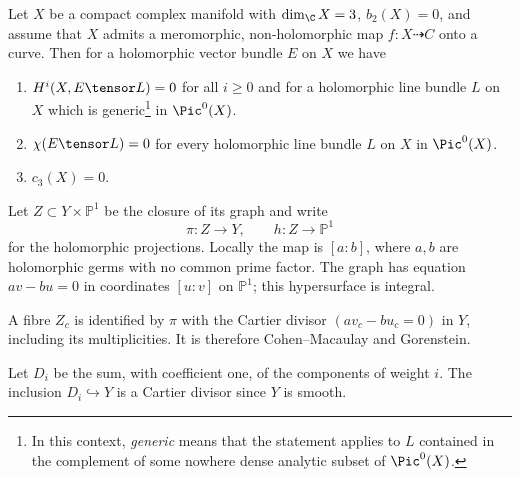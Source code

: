 
\begin{theorem}\label{theorem main2 new}
Let $X$ be a compact complex manifold with $\dim_\C X=3$, $b_2(X)=0$, and assume that $X$ admits a meromorphic, non-holomorphic map  $f\colon X\dashrightarrow C$  onto a curve. Then for a holomorphic vector bundle $E$ on $X$ we have
\begin{enumerate}
	\item $H^i(X,E\tensor L) = 0$ for all $i \geq 0$ and for a holomorphic line bundle $L$ on $X$ which is generic\footnote{In this context, \emph{generic} means that the statement applies to $L$ contained in the complement of some nowhere dense analytic subset of $\Pic^0(X)$.}   in $\Pic^0(X)$.
	\item $\chi(E\tensor L) = 0$ for every holomorphic line bundle $L$ on $X$ in $\Pic^0(X)$.
	\item $c_3(X)=0$.
\end{enumerate}
\end{theorem}

Let $Z\subset Y\times\mathbb P^1$ be the closure of its graph and write
\[
 \pi:Z\to Y,\qquad h:Z\to\mathbb P^1
\]
for the holomorphic projections. Locally the map is $[a:b]$, where
$a,b$ are holomorphic germs with no common prime factor. The graph has
equation $av-bu=0$ in coordinates $[u:v]$ on $\mathbb P^1$; this
hypersurface is integral.

A fibre $Z_c$ is identified
by $\pi$ with the Cartier divisor $(a v_c-bu_c=0)$ in $Y$, including
its multiplicities. It is therefore Cohen--Macaulay and Gorenstein.

Let $D_i$ be the sum, with coefficient
one, of the components of weight $i$. The inclusion $D_i\hookrightarrow
Y$ is a Cartier divisor since $Y$ is smooth.
